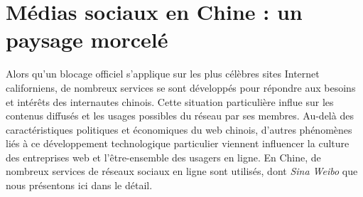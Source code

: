 \section[Médias sociaux en Chine : un paysage morcelé]{Médias sociaux en Chine : un paysage morcelé}

Alors qu’un blocage officiel s’applique sur les plus célèbres sites Internet californiens, de nombreux services se sont développés pour répondre aux besoins et intérêts des internautes chinois. Cette situation particulière influe sur les contenus diffusés et les usages possibles du réseau par ses membres. Au-delà des caractéristiques politiques et économiques du web chinois, d’autres phénomènes liés à ce développement technologique particulier viennent influencer la culture des entreprises web et l’être-ensemble des usagers en ligne. En Chine, de nombreux services de réseaux sociaux en ligne sont utilisés, dont \textit{Sina Weibo} que nous présentons ici dans le détail. 

